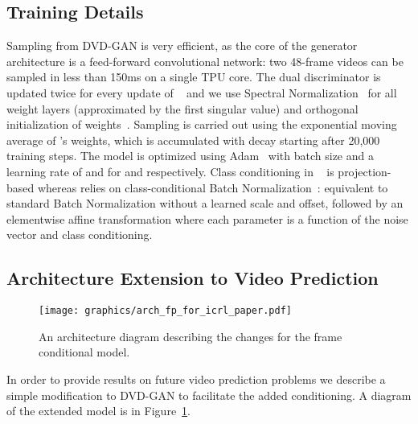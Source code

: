 \documentclass{article} \usepackage{iclr2020_conference,times}
\begin{document}
\subsection{Training Details}
\label{ap:train}

Sampling from DVD-GAN is very efficient, as the core of the generator architecture is a feed-forward convolutional network: two  48-frame videos can be sampled in less than 150ms on a single TPU core. 
The dual discriminator  is updated twice for every update of ~\citep{heusel2017gans} and we use Spectral Normalization~\citep{zhang2018self} for all weight layers (approximated by the first singular value) and orthogonal initialization of weights~\citep{saxe2013exact}. 
Sampling is carried out using the exponential moving average of 's weights, which is accumulated with decay  starting after 20,000 training steps.
The model is optimized using Adam~\citep{kingma2014adam} with batch size  and a learning rate of  and  for  and  respectively. Class conditioning in ~\citep{miyato2018cgans} is projection-based  whereas  relies on class-conditional Batch Normalization~\citep{ioffe2015batch, de2017modulating, dumoulin2017learned}: equivalent to standard Batch Normalization without a learned scale and offset, followed by an elementwise affine transformation where each parameter is a function of the noise vector and class conditioning. 

\subsection{Architecture Extension to Video Prediction}
\label{ss:dvdgan_cond}


\begin{figure}[t]
\centering
\texttt{[image: graphics/arch\_fp\_for\_icrl\_paper.pdf]}
\vspace{-1em}
\caption{An architecture diagram describing the changes for the frame conditional model.}
\label{fig:diagram_fp}
\end{figure}

In order to provide results on future video prediction problems we describe a simple modification to DVD-GAN to facilitate the added conditioning. A diagram of the extended model is in Figure~\ref{fig:diagram_fp}.
\end{document}
